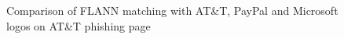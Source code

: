 \documentclass[12pt,twoside]{report}
\begin{document}
\begin{figure}
\begin{center}
    \endminipage
\end{center}
\caption{Comparison of FLANN matching with AT\&T, PayPal and Microsoft logos on AT\&T phishing page}\label{fig:flannmatchingcomparison}
\end{figure}
\restoregeometry
{}
\begin{figure}[!h]
\begin{center}
      \\\\
      \\\\

\end{center}
\end{figure}
\end{document}
